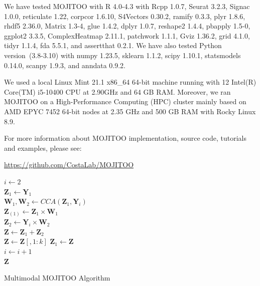 We have tested MOJITOO with R 4.0-4.3 with Rcpp 1.0.7, Seurat 3.2.3,  Signac 1.0.0, reticulate 1.22, corpcor 1.6.10,  S4Vectors 0.30.2,  ramify 0.3.3,  plyr 1.8.6,  rhdf5 2.36.0,  Matrix 1.3-4,  glue 1.4.2,  dplyr 1.0.7,  reshape2 1.4.4,  pbapply 1.5-0,  ggplot2 3.3.5, ComplexHeatmap 2.11.1, patchwork 1.1.1, Gviz 1.36.2, grid 4.1.0, tidyr 1.1.4, fda 5.5.1, and assertthat 0.2.1. We have also tested Python version~(3.8-3.10) with numpy 1.23.5, sklearn 1.1.2, scipy 1.10.1, statsmodels 0.14.0, scanpy 1.9.3, and anndata 0.9.2.

We used a local Linux Mint 21.1 x86\_64 64-bit machine running with 12 Intel(R) Core(TM) i5-10400 CPU at 2.90GHz and 64 GB RAM. Moreover, we ran MOJITOO on a High-Performance Computing (HPC) cluster mainly based on AMD EPYC 7452 64-bit nodes at 2.35 GHz and 500 GB RAM with  Rocky Linux 8.9.

For more information about MOJITOO implementation, source code, tutorials and examples, please see:
\begin{center}
\url{https://github.com/CostaLab/MOJITOO}
\end{center}



\begin{algorithm}

	$i \gets 2$ \\
	$\mathbf{Z}_{1} \gets \mathbf{Y}_{1}$ \\
	{
		$\mathbf{W}_{1}, \mathbf{W}_{2} \gets CCA(\mathbf{Z}_{1}, \mathbf{Y}_{i})$ \\
		$\mathbf{Z}_{(1)} \gets \mathbf{Z}_{1}\times \mathbf{W}_{1}$ \\
		$\mathbf{Z}_{2} \gets \mathbf{Y}_{i}\times \mathbf{W}_{2}$  \\
		$\mathbf{Z} \gets \mathbf{Z}_{1} + \mathbf{Z}_{2}$ \\
		$\mathbf{Z} \gets \mathbf{Z}[, 1:k]$
		$\mathbf{Z}_{1} \gets \mathbf{Z}$ \\
		$i \gets i+1$  \\
	}
	\Return $\mathbf{Z}$
	\caption{Multimodal MOJITOO Algorithm }
	\label{alg:MOJITOO}
\end{algorithm}

